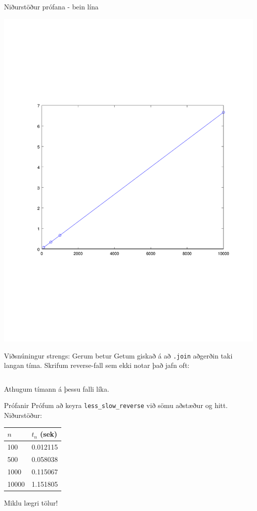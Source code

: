 \documentclass{beamer}
\begin{document}
\begin{frame}{Niðurstöður prófana - bein lína}
\begin{center}
\includegraphics[height=\textheight]{Pics/lineartime1}
\end{center}
\end{frame}

\begin{frame}{Viðsnúningur strengs: Gerum betur}
Getum giskað á að \texttt{.join} aðgerðin taki langan tíma. Skrifum reverse-fall sem ekki notar það jafn oft:

\inputminted{python}{Code/Python/less_slow_reverse.py}

Athugum tímann á þessu falli líka.
\end{frame}

\begin{frame}{Prófanir}
Prófum að keyra \texttt{less\_slow\_reverse} við sömu aðstæður og hitt. Niðurstöður:

\begin{center}
\begin{tabular}{ll}
\toprule
$n$&$t_n$ (sek)\\
\midrule
100&0.012115\\
500&0.058038\\
1000&0.115067\\
10000&1.151805\\
\bottomrule
\end{tabular}
\end{center}

Miklu lægri tölur!
\end{frame}
\end{document}
